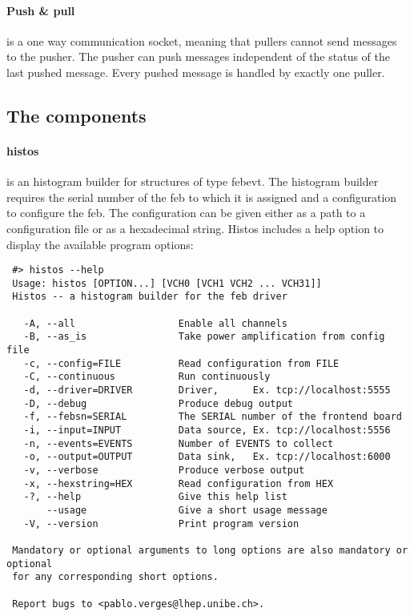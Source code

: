 \paragraph{Push \& pull} is a one way communication socket, meaning that pullers cannot send messages to the pusher.
The pusher can push messages independent of the status of the last pushed message.
Every pushed message is handled by exactly one puller.

\subsection{The components}

\paragraph{histos} is an histogram builder for structures of type febevt.
The histogram builder requires the serial number of the \gls{feb} to which it is assigned and a configuration to configure the \gls{feb}.
The configuration can be given either as a path to a configuration file or as a hexadecimal string.
Histos includes a help option to display the available program options:

\begin{verbatim}
 #> histos --help
 Usage: histos [OPTION...] [VCH0 [VCH1 VCH2 ... VCH31]]
 Histos -- a histogram builder for the feb driver

   -A, --all                  Enable all channels
   -B, --as_is                Take power amplification from config file
   -c, --config=FILE          Read configuration from FILE
   -C, --continuous           Run continuously
   -d, --driver=DRIVER        Driver,      Ex. tcp://localhost:5555
   -D, --debug                Produce debug output
   -f, --febsn=SERIAL         The SERIAL number of the frontend board
   -i, --input=INPUT          Data source, Ex. tcp://localhost:5556
   -n, --events=EVENTS        Number of EVENTS to collect
   -o, --output=OUTPUT        Data sink,   Ex. tcp://localhost:6000
   -v, --verbose              Produce verbose output
   -x, --hexstring=HEX        Read configuration from HEX
   -?, --help                 Give this help list
       --usage                Give a short usage message
   -V, --version              Print program version

 Mandatory or optional arguments to long options are also mandatory or optional
 for any corresponding short options.

 Report bugs to <pablo.verges@lhep.unibe.ch>.
\end{verbatim}

